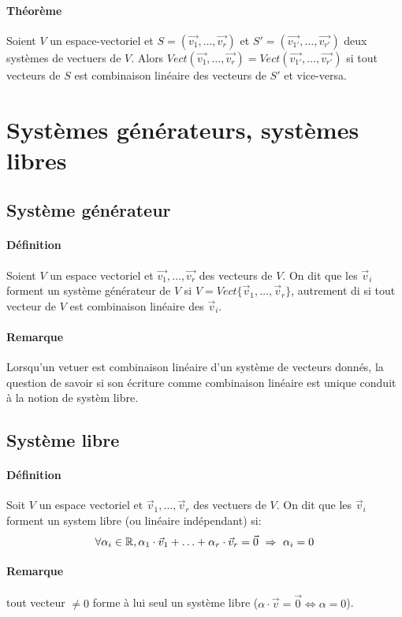 \paragraph{Théorème} Soient $V$ un espace-vectoriel et $S = (\vec{v_1}, \ldots, \vec{v_r})$ et $S' = (\vec{v_{1'}}, \ldots, \vec{v_{r'}})$ deux systèmes de vectuers de $V$. Alors $Vect(\vec{v_1}, \ldots, \vec{v_r}) = Vect(\vec{v_{1'}}, \ldots, \vec{v_{r'}})$ si tout vecteurs de $S$ est combinaison linéaire des vecteurs de $S'$ et vice-versa.

%
%
\section{Systèmes générateurs, systèmes libres}
%
%


%
\subsection{Système générateur}
%
\paragraph{Définition} Soient $V$ un espace vectoriel et $\vec{v_1}, \ldots, \vec{v_r}$ des vecteurs de $V$. On dit que les $\vec{v}_i$ forment un système générateur de $V$ si $V = Vect\{\vec{v}_1, \ldots, \vec{v}_r\}$, autrement di si tout vecteur de $V$ est combinaison linéaire des $\vec{v}_i$.

\paragraph{Remarque} Lorsqu'un vetuer est combinaison linéaire d'un système de vecteurs donnés, la question de savoir si son écriture comme combinaison linéaire est unique conduit à la notion de systèm libre.


%
\subsection{Système libre}
%
\paragraph{Définition} Soit $V$ un espace vectoriel et $\vec{v}_1, \ldots , \vec{v}_r$ des vectuers de $V$. On dit que les $\vec{v}_i$ forment un system libre (ou linéaire indépendant) si:
$$\forall \alpha_i \in \mathbb{R}, \alpha_1 \cdot \vec{v}_1 + \ldots + \alpha_r \cdot \vec{v}_r = \vec{0} ~ \Rightarrow ~ \alpha_i = 0$$
\paragraph{Remarque} tout vecteur $\neq 0$ forme à lui seul un système libre ($\alpha \cdot \vec{v} = \vec{0} \Leftrightarrow \alpha = 0$).



